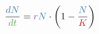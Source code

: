 \documentclass[preview]{standalone}
\begin{document}
\begin{center}

\newcommand{\popSize}{\color{blue}}
\newcommand{\diffSize}{\color{blue}}
\newcommand{\diffTime}{\color{green}}
\newcommand{\growthRate}{\color{purple}}
\newcommand{\carrCap}{\color{red}}
\newcommand{\plain}{\color{black}}

\begin{equation*}
\frac{\diffSize{}dN\plain{}}{\diffTime{}dt\plain{}}=\growthRate{}r\plain{}\popSize{}N\plain{}\cdot\left(1-\frac{\popSize{}N\plain{}}{\carrCap{}K\plain{}}\right)
\end{equation*}
\end{center}
\end{document}
